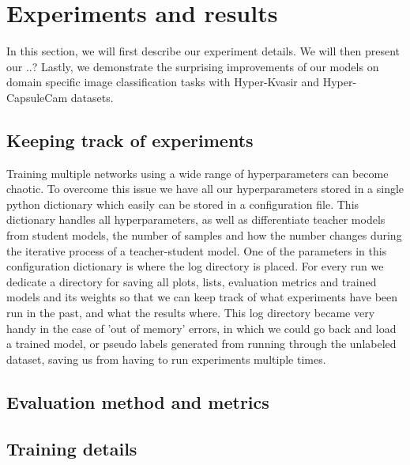 \documentclass[thesis.tex]{subfiles}
\begin{document}
\chapter{Experiments and results} \label{chap:experiments}
In this section, we will first describe our experiment details. We will then present our ..?
Lastly, we demonstrate the surprising improvements of our models on domain specific image classification tasks with Hyper-Kvasir and Hyper-CapsuleCam datasets.




\section{Keeping track of experiments}
Training multiple networks using a wide range of hyperparameters can become chaotic. To overcome this issue we have all our hyperparameters stored in a single python dictionary which easily can be stored in a configuration file. This dictionary handles all hyperparameters, as well as differentiate teacher models from student models, the number of samples and how the number changes during the iterative process of a teacher-student model. One of the parameters in this configuration dictionary is where the log directory is placed. For every run we dedicate a directory for saving all plots, lists, evaluation metrics and trained models and its weights so that we can keep track of what experiments have been run in the past, and what the results where. This log directory became very handy in the case of 'out of memory' errors, in which we could go back and load a trained model, or pseudo labels generated from running through the unlabeled dataset, saving us from having to run experiments multiple times.



\section{Evaluation method and metrics}



\section{Training details}
\end{document}
